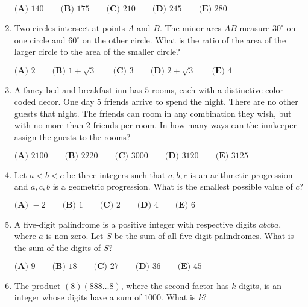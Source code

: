 \documentclass{article}
\begin{document}
\begin{enumerate}[label=\arabic*., itemsep=0.5em]
\(\textbf{(A) }140\qquad
\textbf{(B) }175\qquad
\textbf{(C) }210\qquad
\textbf{(D) }245\qquad
\textbf{(E) }280\qquad\)\par \vspace{0.5em}\item Two circles intersect at points \(A\) and \(B\).  The minor arcs \(AB\) measure \(30^\circ\) on one circle and \(60^\circ\) on the other circle.  What is the ratio of the area of the larger circle to the area of the smaller circle?

\(\textbf{(A) }2\qquad
\textbf{(B) }1+\sqrt3\qquad
\textbf{(C) }3\qquad
\textbf{(D) }2+\sqrt3\qquad
\textbf{(E) }4\qquad\)\par \vspace{0.5em}\item A fancy bed and breakfast inn has \(5\) rooms, each with a distinctive color-coded decor.  One day \(5\) friends arrive to spend the night.  There are no other guests that night.  The friends can room in any combination they wish, but with no more than \(2\) friends per room.  In how many ways can the innkeeper assign the guests to the rooms?

\(\textbf{(A) }2100\qquad
\textbf{(B) }2220\qquad
\textbf{(C) }3000\qquad
\textbf{(D) }3120\qquad
\textbf{(E) }3125\qquad\)\par \vspace{0.5em}\item Let \(a<b<c\) be three integers such that \(a,b,c\) is an arithmetic progression and \(a,c,b\) is a geometric progression.  What is the smallest possible value of \(c\)?

\(\textbf{(A) }-2\qquad
\textbf{(B) }1\qquad
\textbf{(C) }2\qquad
\textbf{(D) }4\qquad
\textbf{(E) }6\qquad\)\par \vspace{0.5em}\item A five-digit palindrome is a positive integer with respective digits \(abcba\), where \(a\) is non-zero.  Let \(S\) be the sum of all five-digit palindromes.  What is the sum of the digits of \(S\)?

\(\textbf{(A) }9\qquad
\textbf{(B) }18\qquad
\textbf{(C) }27\qquad
\textbf{(D) }36\qquad
\textbf{(E) }45\qquad\)\par \vspace{0.5em}\item The product \((8)(888\ldots 8)\), where the second factor has \(k\) digits, is an integer whose digits have a sum of \(1000\).  What is \(k\)?


\end{enumerate}
\end{document}
